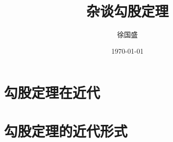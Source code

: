 \documentclass[UTF8]{ctexart}
\title{杂谈勾股定理}
\author{徐国盛}
\date{\today}
\begin{document}
\maketitle
\tableofcontents
\section{勾股定理在近代}
\section{勾股定理的近代形式}

\end{document}
